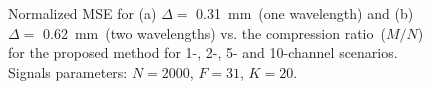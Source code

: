 \documentclass{article}
\theoremstyle{definition}
\begin{document}
\begin{figure}[htb]
	\hfill%
	\hfill%
	\hfill%
	\caption{Normalized MSE for (a) $\Delta = $ \SI{0.31}{\milli\metre}~(one wavelength) and (b) $\Delta = $ \SI{0.62}{\milli\metre}~(two wavelengths) vs. the compression ratio~($M/N$) for the proposed method for \num{1}-, \num{2}-, \num{5}- and \num{10}-channel scenarios. Signals parameters: $N=2000$, $F=31$, $K=20$.}
	\label{fig_synth_US}
\end{figure}
\end{document}
